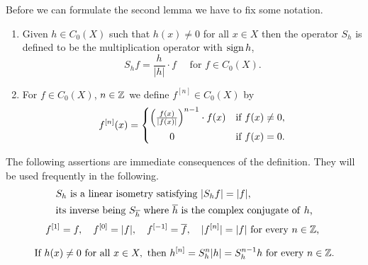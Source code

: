 Before we can formulate the second lemma we have to fix some notation.
\begin{definition}\label{def:b3-2.2}
\begin{enumerate}

\item
Given $h \in C_{0}(X)$ such that $h(x) \neq 0$ for all $x \in X$ then the operator $S_{h}$ is defined to be the multiplication operator with $ \operatorname{sign} h $, \ie
		\begin{equation}\label{eq:b3-2.3}
			S_{h}f = \frac{h}{|h|}\cdot f \quad\text{ for } f \in C_{0}(X) .
		\end{equation}
		
\item
For $f \in C_{0}(X)$, $n \in \mathbb{Z}$ we define $f^{[n]} \in C_{0}(X)$ by
\begin{equation}\label{eq:b3-2.4}
	f^{[n]}(x) = 
	\begin{cases}
        \mleft(\frac{f(x)}{|f(x)|}\mright)^{n-1}
        \cdot f(x) & \text{if } f(x) \neq 0 , \\			
			\qquad 0 \rule{0ex}{3ex}& \text{if } f(x) = 0.
			\end{cases}
\end{equation}
\end{enumerate}
\end{definition}
The following assertions are immediate consequences of the definition. 
They will be used frequently in the following.
\begin{equation}\label{eq:b3-2.5}
	\begin{split}
		&S_{h} \text{  is a linear isometry satisfying  } |S_{h}f| = |f|, \\ 
		&\text{its inverse being  } S_{\overline{h}} \text{  where  } \overline{h} \text{ is the complex conjugate of\/ $ h $,}
	\end{split}
\end{equation}
\begin{equation}\label{eq:b3-2.6}
	    f^{[1]} = f, \quad f^{[0]} = |f|, \quad f^{[-1]} = \overline{f}, \quad |f^{[n]}| = |f| \text{  for every $n \in \mathbb{Z}$, }
\end{equation}
\begin{equation}\label{eq:b3-2.7}\rule{0ex}{3ex}
	\text{If  } h(x) \neq 0 \text{  for all  } x \in X, \text{  then  } h^{[n]} = S_{h}^{n}|h| = S_{h}^{n-1}h
	\text{  for every $ n \in \Z $.} 
\end{equation}
